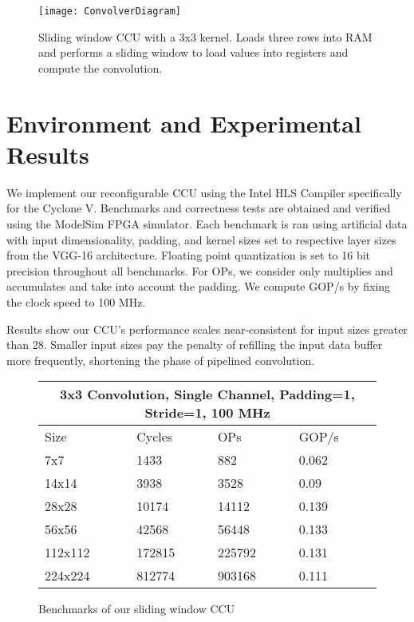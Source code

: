 \begin{figure}
	\centering
	\texttt{[image: ConvolverDiagram]}
	\caption[Convolver Diagram]%
	{\narrower Sliding window CCU with a 3x3 kernel. Loads three rows into RAM and performs a sliding window to load values into registers and compute the convolution.}
	\label{convolver}
\end{figure}


\section{Environment and Experimental Results}
We implement our reconfigurable CCU using the Intel HLS Compiler specifically for the Cyclone V. Benchmarks and correctness tests are obtained and verified using the ModelSim FPGA simulator. Each benchmark is ran using artificial data with input dimensionality, padding, and kernel sizes set to respective layer sizes from the VGG-16 architecture. Floating point quantization is set to 16 bit precision throughout all benchmarks. For OPs, we consider only multiplies and accumulates and take into account the padding. We compute GOP/s by fixing the clock speed to 100 MHz.

Results show our CCU's performance scales near-consistent for input sizes greater than 28. Smaller input sizes pay the penalty of refilling the input data buffer more frequently, shortening the phase of pipelined convolution. 


\begin{figure}
\centering
\begin{tabular}{ |p{3cm}|p{3cm}|p{3cm}|p{3cm}|  }
	\hline
	\multicolumn{4}{|c|}{3x3 Convolution, Single Channel, Padding=1, Stride=1, 100 MHz} \\
	\hline
	Size & Cycles & OPs & GOP/s \\
	\hline
	7x7       & 1433      & 882      & 0.062\\
	14x14    & 3938     & 3528    & 0.09 \\
	28x28   & 10174    & 14112    & 0.139\\
	56x56   & 42568   & 56448  & 0.133\\
	112x112  & 172815  & 225792 & 0.131 \\
	224x224 & 812774  & 903168 & 0.111\\
	
	\hline
\end{tabular}
\label{result_1}
\caption{Benchmarks of our sliding window CCU}
\end{figure}




